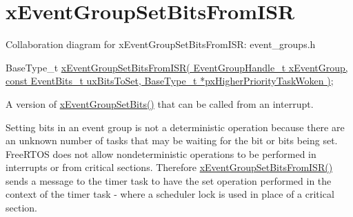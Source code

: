 \hypertarget{group__x_event_group_set_bits_from_i_s_r}{}\section{x\+Event\+Group\+Set\+Bits\+From\+I\+SR}
\label{group__x_event_group_set_bits_from_i_s_r}
Collaboration diagram for x\+Event\+Group\+Set\+Bits\+From\+I\+SR\+:
event\+\_\+groups.\+h 
\begin{DoxyPre}
   BaseType\_t \hyperlink{vendor_2ceedling_2plugins_2freertos_2src_2freertos_2include_2event__groups_8h_a62b68278abac6358369ae8e390988a02}{xEventGroupSetBitsFromISR( EventGroupHandle\_t xEventGroup, const EventBits\_t uxBitsToSet, BaseType\_t *pxHigherPriorityTaskWoken )};
  \end{DoxyPre}


A version of \hyperlink{externals_2freertos_2include_2event__groups_8h_a02d7b3bb55f7e11d9c47116266c5fb2e}{x\+Event\+Group\+Set\+Bits()} that can be called from an interrupt.

Setting bits in an event group is not a deterministic operation because there are an unknown number of tasks that may be waiting for the bit or bits being set. Free\+R\+T\+OS does not allow nondeterministic operations to be performed in interrupts or from critical sections. Therefore \hyperlink{vendor_2ceedling_2plugins_2freertos_2src_2freertos_2include_2event__groups_8h_a62b68278abac6358369ae8e390988a02}{x\+Event\+Group\+Set\+Bits\+From\+I\+S\+R()} sends a message to the timer task to have the set operation performed in the context of the timer task -\/ where a scheduler lock is used in place of a critical section.



